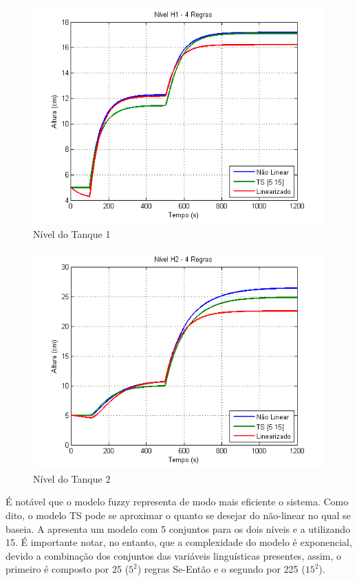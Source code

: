 \begin{figure}[H]
	\centering
	\includegraphics[width=\textwidth]{img/h1_ts2.png}
	\caption{\small Nível do Tanque 1}
	\label{figH1TS2}
\end{figure}

\begin{figure}[H]
	\centering
	\includegraphics[width=\textwidth ]{img/h2_ts2.png}
	\caption{\small Nível do Tanque 2}
	\label{figH2TS2}
\end{figure}

É notável que o modelo fuzzy representa de modo mais eficiente o sistema. Como dito, o modelo TS pode se aproximar o quanto se desejar do não-linear no qual se baseia. A  apresenta um modelo com 5 conjuntos para os dois níveis e a  utilizando 15. É importante notar, no entanto, que a complexidade do modelo é exponencial, devido a combinação dos conjuntos das variáveis linguísticas presentes, assim, o primeiro é composto por 25 ($5^2$) regras Se-Então e o segundo por 225 ($15^2$).

